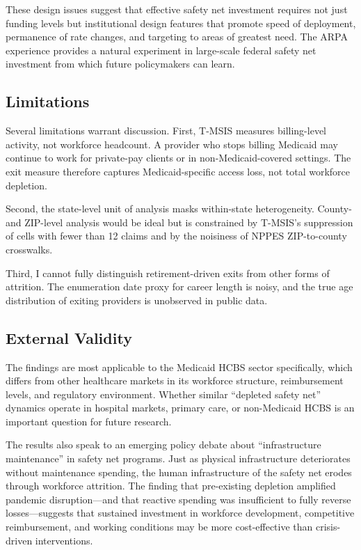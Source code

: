 \documentclass[12pt]{article}
\begin{document}
These design issues suggest that effective safety net investment requires not just funding levels but institutional design features that promote speed of deployment, permanence of rate changes, and targeting to areas of greatest need. The ARPA experience provides a natural experiment in large-scale federal safety net investment from which future policymakers can learn.

\subsection{Limitations}

Several limitations warrant discussion. First, T-MSIS measures billing-level activity, not workforce headcount. A provider who stops billing Medicaid may continue to work for private-pay clients or in non-Medicaid-covered settings. The exit measure therefore captures Medicaid-specific access loss, not total workforce depletion.

Second, the state-level unit of analysis masks within-state heterogeneity. County- and ZIP-level analysis would be ideal but is constrained by T-MSIS's suppression of cells with fewer than 12 claims and by the noisiness of NPPES ZIP-to-county crosswalks.

Third, I cannot fully distinguish retirement-driven exits from other forms of attrition. The enumeration date proxy for career length is noisy, and the true age distribution of exiting providers is unobserved in public data.

\subsection{External Validity}

The findings are most applicable to the Medicaid HCBS sector specifically, which differs from other healthcare markets in its workforce structure, reimbursement levels, and regulatory environment. Whether similar ``depleted safety net'' dynamics operate in hospital markets, primary care, or non-Medicaid HCBS is an important question for future research.

The results also speak to an emerging policy debate about ``infrastructure maintenance'' in safety net programs. Just as physical infrastructure deteriorates without maintenance spending, the human infrastructure of the safety net erodes through workforce attrition. The finding that pre-existing depletion amplified pandemic disruption---and that reactive spending was insufficient to fully reverse losses---suggests that sustained investment in workforce development, competitive reimbursement, and working conditions may be more cost-effective than crisis-driven interventions.
\end{document}
